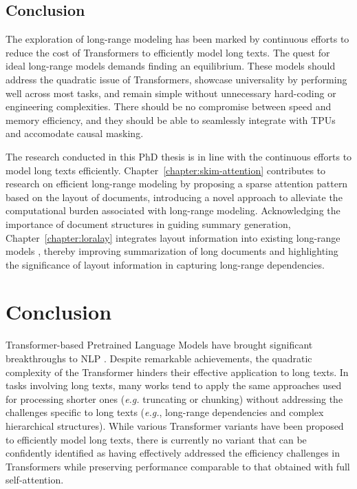 \subsection{Conclusion}

The exploration of long-range modeling has been marked by continuous efforts to reduce the cost of Transformers to efficiently model long texts. The quest for ideal long-range models demands finding an equilibrium. These models should address the quadratic issue of Transformers, showcase universality by performing well across most tasks, and remain simple without unnecessary hard-coding or engineering complexities. There should be no compromise between speed and memory efficiency, and they should be able to seamlessly integrate with TPUs and accomodate causal masking. 

The research conducted in this PhD thesis is in line with the continuous efforts to model long texts efficiently. Chapter~\ref{chapter:skim-attention} contributes to research on efficient long-range modeling by proposing a sparse attention pattern based on the layout of documents, introducing a novel approach to alleviate the computational burden associated with long-range modeling. Acknowledging the importance of document structures in guiding summary generation, Chapter~\ref{chapter:loralay} integrates layout information into existing long-range models \citep{zaheer2020big}, thereby improving summarization of long documents and highlighting the significance of layout information in capturing long-range dependencies. 

\section{Conclusion}

Transformer-based Pretrained Language Models have brought significant breakthroughs to \ac{NLP} \citep{devlin2018bert, lewis2019bart, brown2020language}. Despite remarkable achievements, the quadratic complexity of the Transformer hinders their effective application to long texts. In tasks involving long texts, many works tend to apply the same approaches used for processing shorter ones (\textit{e.g.} truncating or chunking) without addressing the challenges specific to long texts (\textit{e.g.}, long-range dependencies and complex hierarchical structures). While various Transformer variants have been proposed to efficiently model long texts, there is currently no variant that can be confidently identified as having effectively addressed the efficiency challenges in Transformers while preserving performance comparable to that obtained with full self-attention.

